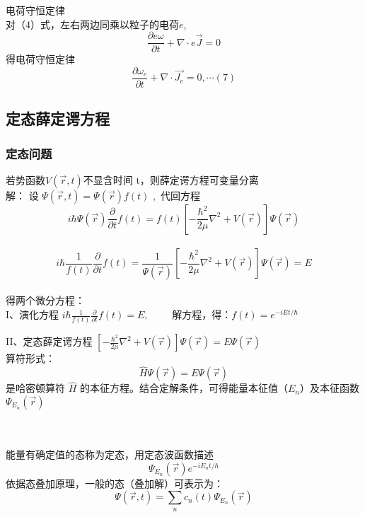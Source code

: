 \begin{frame}\frametitle{}
    {\Bullet} 电荷守恒定律\\ \vspace{0.3em}
    对（4）式，左右两边同乘以粒子的电荷$e$, 
    \begin{equation*}
        \frac{\partial e\omega}{\partial t}+ \nabla \cdot e\vec{J}=0
    \end{equation*}  
    得电荷守恒定律
    \begin{equation*}
        \frac{\partial \omega_e}{\partial t}+ \nabla \cdot \vec{J_e}=0, \cdots (7)
    \end{equation*}  
\end{frame}

\subsection{定态薛定谔方程}

\begin{frame} 
    \frametitle{定态问题}
    若势函数$V(\vec{r},t ) $不显含时间 t，则薛定谔方程可变量分离 \\ \vspace{0.3cm}
    \alert{解：}  设  $\Psi (\vec{r},t )  = \Psi (\vec{r} ) f(t) $ , 代回方程 \\ 
     { $$ \displaystyle i\hbar \Psi (\vec{r})  \frac{\partial }{\partial t} f(t)=f(t) \left [ -\frac{\hbar^2}{2\mu }\nabla ^2 + V(\vec{r}) \right ]\Psi (\vec{r}) $$}  \\ 	
     { $$ \displaystyle i\hbar \frac{1}{f(t)}  \frac{\partial }{\partial t} f(t)= \frac{1}{\Psi (\vec{r}) } \left [ -\frac{\hbar^2}{2\mu }\nabla ^2 + V(\vec{r}) \right ]\Psi (\vec{r}) =E $$}  \\ \vspace{0.3cm} 
     得两个微分方程：\\  \vspace{0.3cm}
     I、演化方程  $ \displaystyle  i\hbar \frac{1}{f(t)}  \frac{\partial }{\partial t} f(t)=E, \qquad $  
        解方程，得：$\displaystyle  f(t) =e^{-iEt/\hbar}$ 
\end{frame}

\begin{frame} 
    II、定态薛定谔方程 $\displaystyle   \left [ -\frac{\hbar^2}{2\mu }\nabla ^2 + V(\vec{r}) \right ]\Psi (\vec{r}) =E \Psi (\vec{r})  $   \\ 
    算符形式：$$\displaystyle   \hat{H} \Psi (\vec{r}) =E \Psi (\vec{r})  $$   
    是哈密顿算符 $\hat{H}$ 的本征方程。结合定解条件，可得能量本征值（$E_n$）及本征函数 $\Psi_{E_n} (\vec{r} )$ 

    ~~\\ 
    \emf[定态：]\\
    能量有确定值的态称为定态，用定态波函数描述
        \[ \Psi_{E_n} (\vec{r} ) e^{-i E_n t/\hbar} \] 
    依据态叠加原理，一般的态（叠加解）可表示为：
    \[ \Psi (\vec{r},t ) =\sum\limits_n c_n(t)\Psi_{E_n} (\vec{r} ) \]
\end{frame}

